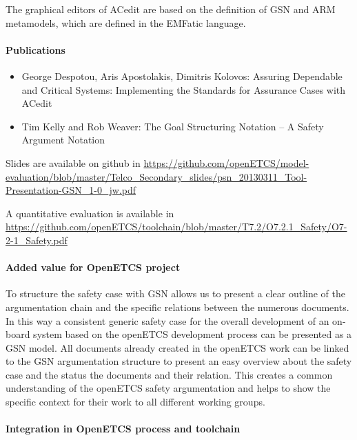 The graphical editors of ACedit are based on the definition of GSN and ARM metamodels, which are defined in the EMFatic language.        

\paragraph{Publications}

\begin{itemize}
\item George Despotou, Aris Apostolakis, Dimitris Kolovos: Assuring Dependable and Critical Systems: Implementing the Standards for Assurance Cases with ACedit
\item Tim Kelly and Rob Weaver: The Goal Structuring Notation – A Safety Argument Notation 
\end{itemize}

Slides are available on github in 
\url{https://github.com/openETCS/model-evaluation/blob/master/Telco_Secondary_slides/psn_20130311_Tool-Presentation-GSN_1-0_jw.pdf}

A quantitative evaluation is available in 
\url{https://github.com/openETCS/toolchain/blob/master/T7.2/O7.2.1_Safety/O7-2-1_Safety.pdf}

\paragraph{Added value for OpenETCS project}

To structure the safety case with GSN allows us to present a clear outline of the argumentation chain and the specific relations between the numerous documents. In this way a consistent generic safety case for the overall development of an on-board system based on the openETCS development process can be presented as a GSN model. All documents already created in the openETCS work can be linked to the GSN argumentation structure to present an easy overview about the safety case and the status the documents and their relation. This creates a common understanding of the openETCS safety argumentation and helps to show the specific context for their work to all different working groups. 

\paragraph{Integration in OpenETCS process and toolchain}

